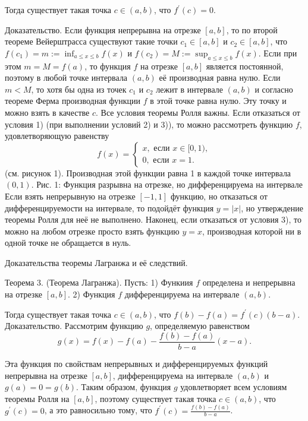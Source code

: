 Тогда существует такая точка $c \in(a, b)$, что $f^{\prime}(c)=0$.

Доказательство. Если функция непрерывна на отрезке $[a, b]$, то по второй теореме Вейерштрасса существуют такие точки $c_1 \in[a, b]$ и $c_2 \in[a, b]$, что $f\left(c_1\right)=m:=\inf _{a \leq x \leq b} f(x)$ и $f\left(c_2\right)=M:=\sup _{a \leq x \leq b} f(x)$. Если при этом $m=M=f(a)$, то функция $f$ на отрезке $[a, b]$ является постоянной, поэтому в любой точке интервала $(a, b)$ её производная равна нулю. Если $m<M$, то хотя бы одна из точек $c_1$ и $c_2$ лежит в интервале $(a, b)$ и согласно теореме Ферма производная функции $f$ в этой точке равна нулю. Эту точку и можно взять в качестве $c$.
Все условия теоремы Ролля важны. Если отказаться от условия 1) (при выполнении условий 2) и 3)), то можно рассмотреть функцию $f$, удовлетворяющую равенству
$$
f(x)=\left\{\begin{array}{l}
x, \text { если } x \in[0,1), \\
0, \text { если } x=1 .
\end{array}\right.
$$
(см. рисунок 1). Производная этой функции равна 1 в каждой точке интервала $(0,1)$.
Рис. 1: Функция разрывна на отрезке, но дифференцируема на интервале
Если взять непрерывную на отрезке $[-1,1]$ функцию, но отказаться от дифференцируемости на интервале, то подойдёт функция $y=|x|$, но утверждение теоремы Ролля для неё не выполнено. Наконец, если отказаться от условия 3), то можно на любом отрезке просто взять функцию $y=x$, производная которой ни в одной точке не обращается в нуль.
\newpage

\begin{problem}
Доказательства теоремы Лагранжа и её следствий.
\end{problem}
Теорема 3. (Теорема Лагранжа). Пусть:
1) Функиия $f$ определена и непрерывна на отрезке $[a, b]$.
2) Функция $f$ дифференцируема на интервале $(a, b)$.

Тогда существует такая точка $c \in(a, b)$, что $f(b)-f(a)=f^{\prime}(c)(b-a)$.
Доказательство. Рассмотрим функцию $g$, определяемую равенством
$$
g(x)=f(x)-f(a)-\frac{f(b)-f(a)}{b-a}(x-a) .
$$

Эта функция по свойствам непрерывных и дифференцируемых функций непрерывна на отрезке $[a, b]$, дифференцируема на интервале $(a, b)$ и $g(a)=0=g(b)$. Таким образом, функция $g$ удовлетворяет всем условиям теоремы Ролля на $[a, b]$, поэтому существует такая точка $c \in(a, b)$, что $g^{\prime}(c)=0$, а это равносильно тому, что $f^{\prime}(c)=\frac{f(b)-f(a)}{b-a}$.

